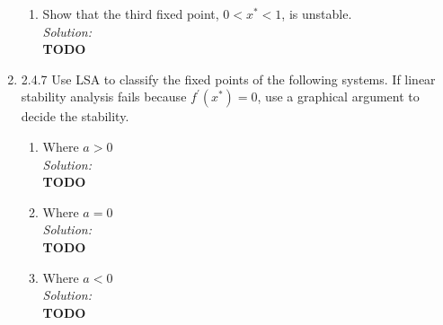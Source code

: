 \documentclass[10pt]{amsart}
\theoremstyle{nonumberplain}
\begin{document}
\begin{enumerate}[label={\bf {\arabic*}:}]
\begin{enumerate}
\item Show that the third fixed point, $0 < x^* < 1$, is unstable. \\

\noindent
\textit{Solution:} \\
\textbf{TODO} \\

\end{enumerate}

\newpage

\item 2.4.7 Use LSA to classify the fixed points of the following systems. If linear stability analysis fails because $f^\prime (x^*) = 0$, use a graphical argument to decide the stability. \\
\begin{enumerate}

\item Where $a > 0$ \\

\noindent
\textit{Solution:} \\
\textbf{TODO} \\

\item Where $a = 0$ \\

\noindent
\textit{Solution:} \\
\textbf{TODO} \\

\item Where $a < 0$ \\

\noindent
\textit{Solution:} \\
\textbf{TODO} \\

\end{enumerate}

\end{enumerate}
\end{document}
